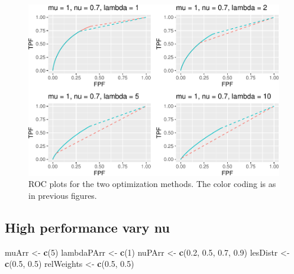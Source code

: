\documentclass[
]{book}
\newenvironment{Shaded}{\begin{snugshade}}{\end{snugshade}}
\newcommand{\DecValTok}[1]{\textcolor[rgb]{0.00,0.00,0.81}{#1}}
\newcommand{\FloatTok}[1]{\textcolor[rgb]{0.00,0.00,0.81}{#1}}
\newcommand{\KeywordTok}[1]{\textcolor[rgb]{0.13,0.29,0.53}{\textbf{#1}}}
\newcommand{\NormalTok}[1]{#1}
\newcommand{\StringTok}[1]{\textcolor[rgb]{0.31,0.60,0.02}{#1}}
\begin{document}
\begin{figure}
\centering
\includegraphics{21-optim-op-point_files/figure-latex/optim-op-point-low-performance-vary-lambda-vary-all-roc-1.pdf}
\caption{\label{fig:optim-op-point-low-performance-vary-lambda-vary-all-roc}ROC plots for the two optimization methods. The color coding is as in previous figures.}
\end{figure}

\hypertarget{optim-op-point-high-performance-vary-nu}{%
\subsection{High performance vary nu}\label{optim-op-point-high-performance-vary-nu}}

\begin{Shaded}
\begin{Highlighting}[]
\NormalTok{muArr <-}\StringTok{ }\KeywordTok{c}\NormalTok{(}\DecValTok{5}\NormalTok{)}
\NormalTok{lambdaPArr <-}\StringTok{ }\KeywordTok{c}\NormalTok{(}\DecValTok{1}\NormalTok{)}
\NormalTok{nuPArr <-}\StringTok{ }\KeywordTok{c}\NormalTok{(}\FloatTok{0.2}\NormalTok{, }\FloatTok{0.5}\NormalTok{, }\FloatTok{0.7}\NormalTok{, }\FloatTok{0.9}\NormalTok{)}
\NormalTok{lesDistr <-}\StringTok{ }\KeywordTok{c}\NormalTok{(}\FloatTok{0.5}\NormalTok{, }\FloatTok{0.5}\NormalTok{)}
\NormalTok{relWeights <-}\StringTok{ }\KeywordTok{c}\NormalTok{(}\FloatTok{0.5}\NormalTok{, }\FloatTok{0.5}\NormalTok{)}
\end{Highlighting}
\end{Shaded}
\end{document}
